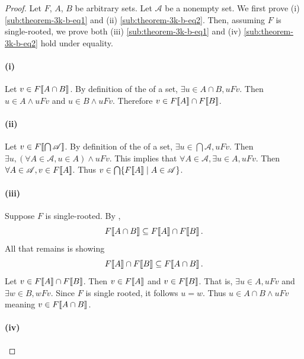 \documentclass{report}
\begin{document}
  \begin{proof}
    Let $F$, $A$, $B$ be arbitrary sets.
    Let $\mathscr{A}$ be a nonempty set.
    We first prove (i) \eqref{sub:theorem-3k-b-eq1} and (ii)
      \eqref{sub:theorem-3k-b-eq2}.
    Then, assuming $F$ is single-rooted, we prove both (iii)
      \eqref{sub:theorem-3k-b-eq1} and (iv) \eqref{sub:theorem-3k-b-eq2} hold
      under equality.

    \paragraph{(i)}%

      Let $v \in F\!\left\llbracket A \cap B\right\rrbracket$.
      By definition of the  of a set,
        $\exists u \in A \cap B, uFv$.
      Then $u \in A \land uFv$ and $u \in B \land uFv$.
      Therefore $v \in F\!\left\llbracket A\right\rrbracket \cap F\!\left\llbracket B\right\rrbracket$.

    \paragraph{(ii)}%

      Let $v \in F\!\left\llbracket\bigcap{\mathscr{A}}\right\rrbracket$.
      By definition of the  of a set,
        $\exists u \in \bigcap{\mathscr{A}}, uFv$.
      Then $\exists u, (\forall A \in \mathscr{A}, u \in A) \land uFv$.
      This implies that $\forall A \in \mathscr{A}, \exists u \in A, uFv$.
      Then $\forall A \in \mathscr{A}, v \in F\!\left\llbracket A\right\rrbracket$.
      Thus $v \in \bigcap\{F\!\left\llbracket A\right\rrbracket \mid A \in \mathscr{A}\}$.

    \paragraph{(iii)}%

      Suppose $F$ is single-rooted.
      By ,
        $$F\!\left\llbracket A \cap B\right\rrbracket \subseteq F\!\left\llbracket A\right\rrbracket \cap F\!\left\llbracket B\right\rrbracket.$$
      All that remains is showing
        $$F\!\left\llbracket A\right\rrbracket \cap F\!\left\llbracket B\right\rrbracket \subseteq F\!\left\llbracket A \cap B\right\rrbracket.$$
      Let $v \in F\!\left\llbracket A\right\rrbracket \cap F\!\left\llbracket B\right\rrbracket$.
      Then $v \in F\!\left\llbracket A\right\rrbracket$ and $v \in F\!\left\llbracket B\right\rrbracket$.
      That is, $\exists u \in A, uFv$ and $\exists w \in B, wFv$.
      Since $F$ is single rooted, it follows $u = w$.
      Thus $u \in A \cap B \land uFv$ meaning $v \in F\!\left\llbracket A \cap B\right\rrbracket$.

    \paragraph{(iv)}%


\end{proof}
\end{document}
